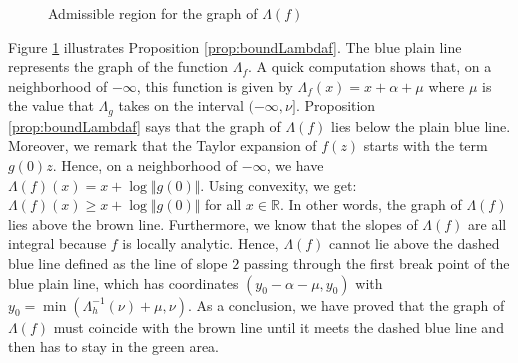 \documentclass{sig-alternate-2013}
\newcommand{\R}{\mathbb R}
\begin{document}
\begin{figure}
\null \hfill
{}
\hfill \null

\vspace{-0.1cm}

\caption{Admissible region for the graph of $\Lambda(f)$}
\label{fig:area}

\end{figure}

Figure \ref{fig:area} illustrates Proposition \ref{prop:boundLambdaf}. 
The blue plain line represents the graph of the function $\Lambda_f$. A 
quick computation shows that, on a neighborhood of ${-}\infty$, this 
function is given by $\Lambda_f(x) = x + \alpha + \mu$
where $\mu$ is the value that $\Lambda_g$ takes on the interval 
$({-}\infty, \nu]$. Proposition \ref{prop:boundLambdaf} says that the
graph of $\Lambda(f)$ lies below the plain blue line. Moreover, we remark
that the Taylor expansion of $f(z)$ starts with the term
$g(0) z$. Hence, on a neighborhood of ${-}\infty$, we have 
$\Lambda(f)(x) = x + \log \Vert g(0) \Vert$. Using convexity, we 
get:
$\Lambda(f)(x) \geq x + \log \Vert g(0) \Vert$
for all $x \in \R$.  In other words, the graph of $\Lambda(f)$ lies above the brown line.
Furthermore, we know that the slopes of $\Lambda(f)$ are all integral
because $f$ is locally analytic. Hence, $\Lambda(f)$ cannot lie above
the dashed blue line defined as the line of slope $2$ passing through
the first break point of the blue plain line, which has coordinates
$(y_0 - \alpha - \mu, y_0)$ with $y_0 = \min(\Lambda_h^{-1}(\nu) + \mu, 
\nu)$. As a conclusion, we have proved that the graph of $\Lambda(f)$ 
must coincide with the brown line until it meets the dashed blue line 
and then has to stay in the green area.
\end{document}
